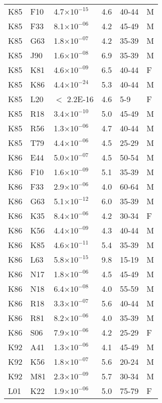 \begin{longtable}{lllrll}
   K85 & F10 & 4.7$\times10^{-15}$ & 4.6 & 40-44 & M \\ 
   K85 & F33 & 8.1$\times10^{-06}$ & 4.2 & 45-49 & M \\ 
   K85 & G63 & 1.8$\times10^{-07}$ & 4.2 & 35-39 & M \\ 
   K85 & J90 & 1.6$\times10^{-08}$ & 6.9 & 35-39 & M \\ 
   K85 & K81 & 4.6$\times10^{-09}$ & 6.5 & 40-44 & F \\ 
   K85 & K86 & 4.4$\times10^{-24}$ & 5.3 & 40-44 & M \\ 
   K85 & L20 & $<$ 2.2E-16 & 4.6 & 5-9 & F \\ 
   K85 & R18 & 3.4$\times10^{-10}$ & 5.0 & 45-49 & M \\ 
   K85 & R56 & 1.3$\times10^{-06}$ & 4.7 & 40-44 & M \\ 
   K85 & T79 & 4.4$\times10^{-06}$ & 4.5 & 25-29 & M \\ 
   K86 & E44 & 5.0$\times10^{-07}$ & 4.5 & 50-54 & M \\ 
   K86 & F10 & 1.6$\times10^{-09}$ & 5.1 & 35-39 & M \\ 
   K86 & F33 & 2.9$\times10^{-06}$ & 4.0 & 60-64 & M \\ 
   K86 & G63 & 5.1$\times10^{-12}$ & 6.0 & 35-39 & M \\ 
   K86 & K35 & 8.4$\times10^{-06}$ & 4.2 & 30-34 & F \\ 
   K86 & K56 & 4.4$\times10^{-09}$ & 4.3 & 40-44 & M \\ 
   K86 & K85 & 4.6$\times10^{-11}$ & 5.4 & 35-39 & M \\ 
   K86 & L63 & 5.8$\times10^{-15}$ & 9.8 & 15-19 & M \\ 
   K86 & N17 & 1.8$\times10^{-06}$ & 4.5 & 45-49 & M \\ 
   K86 & N18 & 6.4$\times10^{-08}$ & 4.0 & 55-59 & M \\ 
   K86 & R18 & 3.3$\times10^{-07}$ & 5.6 & 40-44 & M \\ 
   K86 & R81 & 8.2$\times10^{-06}$ & 4.0 & 35-39 & M \\ 
   K86 & S06 & 7.9$\times10^{-06}$ & 4.2 & 25-29 & F \\ 
   K92 & A41 & 1.3$\times10^{-06}$ & 4.1 & 45-49 & M \\ 
   K92 & K56 & 1.8$\times10^{-07}$ & 5.6 & 20-24 & M \\ 
   K92 & M81 & 2.3$\times10^{-09}$ & 5.7 & 30-34 & M \\ 
   L01 & K22 & 1.9$\times10^{-06}$ & 5.0 & 75-79 & F \\ 

\end{longtable}
